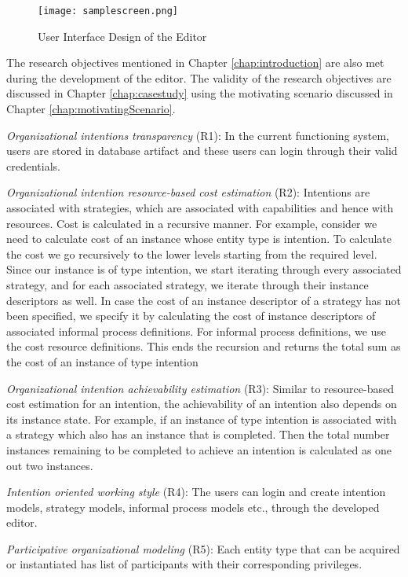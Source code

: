 \begin{figure}
	\centering
	\texttt{[image: samplescreen.png]}
	\caption{User Interface Design of the Editor}
	\label{fig:samplescreen}
\end{figure}

The research objectives mentioned in Chapter \ref{chap:introduction} are also met during the development of the editor. The validity of the research objectives are discussed in Chapter \ref{chap:casestudy} using the motivating scenario discussed in Chapter \ref{chap:motivatingScenario}.

\textit{Organizational intentions transparency} (R1): In the current functioning system, users are stored in database artifact and these users can login through their valid credentials. 

\textit{Organizational intention resource-based cost estimation} (R2): Intentions are associated with strategies, which are associated with capabilities and hence with resources. Cost is calculated in a recursive manner. For example, consider we need to calculate cost of an instance whose entity type is intention. To calculate the cost we go recursively to the lower levels starting from the required level. Since our instance is of type intention, we start iterating through every associated strategy, and for each associated strategy, we iterate through their instance descriptors as well. In case the cost of an instance descriptor of a strategy has not been specified, we specify it by calculating the cost of instance descriptors of associated informal process definitions. For informal process definitions, we use the cost resource definitions. This ends the recursion and returns the total sum as the cost of an instance of type intention

\textit{Organizational intention achievability estimation} (R3): Similar to resource-based cost estimation for an intention, the achievability of an intention also depends on its instance state. For example, if an instance of type intention is associated with a strategy which also has an instance that is completed. Then the total number instances remaining to be completed to achieve an intention is calculated as one out two instances. 

\textit{Intention oriented working style} (R4): The users can login and create intention models, strategy models, informal process models etc., through the developed editor. 

\textit{Participative organizational modeling} (R5): Each entity type that can be acquired or instantiated has list of participants with their corresponding privileges. 

